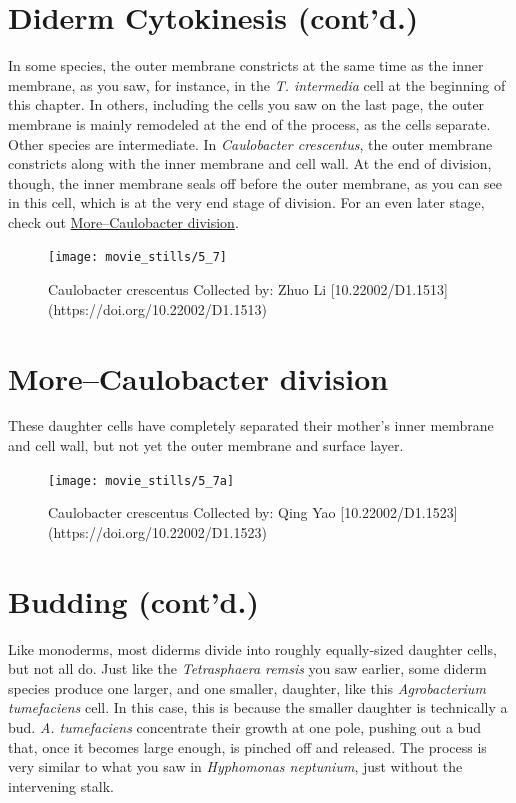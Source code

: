 \documentclass[]{tufte-book}
\begin{document}
\section{Diderm Cytokinesis (cont'd.)}\label{diderm-cytokinesis-contd.}

In some species, the outer membrane constricts at the same time as the
inner membrane, as you saw, for instance, in the \emph{T. intermedia}
cell at the beginning of this chapter. In others, including the cells
you saw on the last page, the outer membrane is mainly remodeled at the
end of the process, as the cells separate. Other species are
intermediate. In \emph{Caulobacter crescentus}, the outer membrane
constricts along with the inner membrane and cell wall. At the end of
division, though, the inner membrane seals off before the outer
membrane, as you can see in this cell, which is at the very end stage of
division. For an even later stage, check out
\protect\hyperlink{morecaulobacter-division}{More--Caulobacter
division}.

\begin{figure}
\texttt{[image: movie\_stills/5\_7]} \caption[Caulobacter crescentus Collected by]{Caulobacter crescentus Collected by: Zhuo Li [10.22002/D1.1513](https://doi.org/10.22002/D1.1513)}\label{fig:unnamed-chunk-90}
\end{figure}

\hypertarget{morecaulobacter-division}{\section{More--Caulobacter
division}\label{morecaulobacter-division}}

These daughter cells have completely separated their mother's inner
membrane and cell wall, but not yet the outer membrane and surface
layer.

\begin{figure}
\texttt{[image: movie\_stills/5\_7a]} \caption[Caulobacter crescentus Collected by]{Caulobacter crescentus Collected by: Qing Yao [10.22002/D1.1523](https://doi.org/10.22002/D1.1523)}\label{fig:unnamed-chunk-91}
\end{figure}

\section{Budding (cont'd.)}\label{budding-contd.}

Like monoderms, most diderms divide into roughly equally-sized daughter
cells, but not all do. Just like the \emph{Tetrasphaera remsis} you saw
earlier, some diderm species produce one larger, and one smaller,
daughter, like this \emph{Agrobacterium tumefaciens} cell. In this case,
this is because the smaller daughter is technically a bud. \emph{A.
tumefaciens} concentrate their growth at one pole, pushing out a bud
that, once it becomes large enough, is pinched off and released. The
process is very similar to what you saw in \emph{Hyphomonas neptunium},
just without the intervening stalk.
\end{document}
